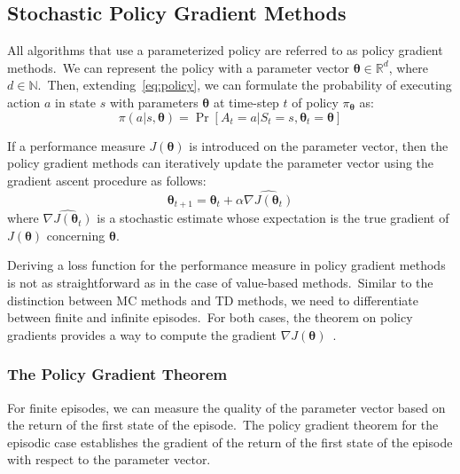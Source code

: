 \documentclass[../xlapes02]{subfiles}
\begin{document}
    \subsection{Stochastic Policy Gradient Methods}\label{subsec:policy-gradient}
    All algorithms that use a parameterized policy are referred to as policy gradient methods.\ We can represent the policy with a parameter vector $ \bm{\theta} \in \mathbb{R}^d $, where $ d \in \mathbb{N} $.\ Then, extending~\cref{eq:policy}, we can formulate the probability of executing action $ a $ in state $ s $ with parameters $ \bm{\theta} $ at time-step $ t $ of policy $ \pi_{\bm{\theta}} $ as:
    \begin{equation}
        \label{eq:policy-parameterized}
        \pi(a|s,\bm{\theta})=\Pr\left[A_t=a|S_t=s,\bm{\theta}_t=\bm{\theta}\right]
    \end{equation}

    If a performance measure $ J(\bm{\theta}) $ is introduced on the parameter vector, then the policy gradient methods can iteratively update the parameter vector using the gradient ascent procedure as follows:
    \begin{equation}
        \label{eq:policy-gradient-ascent}
        \bm{\theta}_{t+1}=\bm{\theta}_t+\alpha\widehat{\nabla J(\bm{\theta}_t)}
    \end{equation}
    where $\widehat{\nabla J(\bm{\theta}_t)}$ is a stochastic estimate whose expectation is the true gradient of $ J(\bm{\theta}) $ concerning $ \bm{\theta} $.

    Deriving a loss function for the performance measure in policy gradient methods is not as straightforward as in the case of value-based methods.\ Similar to the distinction between MC methods and TD methods, we need to differentiate between finite and infinite episodes.\ For both cases, the theorem on policy gradients provides a way to compute the gradient $ \nabla J(\bm{\theta}) $~\cite{sutton2018reinforcement, FITMT25127}.

    \subsubsection{The Policy Gradient Theorem}\label{subsubsec:policy-gradient-theorem}
    For finite episodes, we can measure the quality of the parameter vector based on the return of the first state of the episode.\ The policy gradient theorem for the episodic case establishes the gradient of the return of the first state of the episode with respect to the parameter vector.
\end{document}
